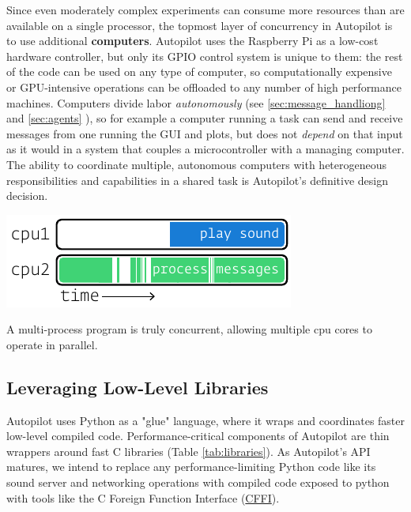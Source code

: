 Since even moderately complex experiments can consume more resources than are available on a single processor, the topmost layer of concurrency in Autopilot is to use additional \textbf{computers}. Autopilot uses the Raspberry Pi as a low-cost hardware controller, but only its GPIO control system is unique to them: the rest of the code can be used on any type of computer, so computationally expensive or GPU-intensive operations can be offloaded to any number of high performance machines. Computers divide labor \textit{autonomously} (see \ref{sec:message_handliong} and \ref{sec:agents} ), so for example a computer running a task can send and receive messages from one running the GUI and plots, but does not \textit{depend} on that input as it would in a system that couples a microcontroller with a managing computer. The ability to coordinate multiple, autonomous computers with heterogeneous responsibilities and capabilities in a shared task is Autopilot's definitive design decision.

\begin{marginfigure}[0.1cm]
 \includegraphics[]{figures/side_14_multiprocess.pdf}
 \caption{A multi-process program is truly concurrent, allowing multiple cpu cores to operate in parallel.}
 \label{fig:multiprocess}
\end{marginfigure}

\subsection{Leveraging Low-Level Libraries}
\label{sec:lowlevel}

Autopilot uses Python as a "glue" language, where it wraps and coordinates faster low-level compiled code\citep{vanrossumGlueItAll1998}.  
Performance-critical components of Autopilot are thin wrappers around fast C libraries (Table \ref{tab:libraries}). As Autopilot's API matures, we intend to replace any performance-limiting Python code like its sound server and networking operations with compiled code exposed to python with tools like the C Foreign Function Interface (\href{https://cffi.readthedocs.io/en/latest/index.html}{CFFI}).

